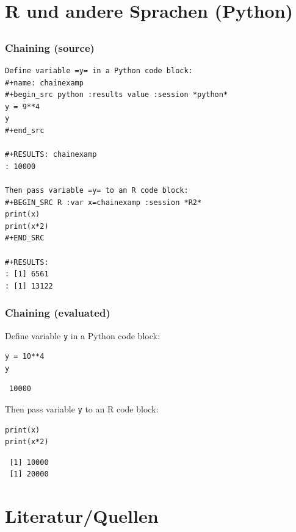 \documentclass[bigger]{beamer}
\begin{document}
\section{R und andere Sprachen (Python)}
\label{sec-4}
\subsection{}
\begin{frame}[fragile,shrink = 10]
\frametitle{Chaining (source)}
\label{sec-4-1-1}




\lstset{language=org}
\begin{lstlisting}
Define variable =y= in a Python code block: 
#+name: chainexamp
#+begin_src python :results value :session *python*
y = 9**4
y
#+end_src

#+RESULTS: chainexamp
: 10000

Then pass variable =y= to an R code block:
#+BEGIN_SRC R :var x=chainexamp :session *R2*
print(x)
print(x*2)
#+END_SRC

#+RESULTS:
: [1] 6561
: [1] 13122
\end{lstlisting}
\end{frame}
\begin{frame}[fragile]
\frametitle{Chaining (evaluated)}
\label{sec-4-1-2}


Define variable \texttt{y} in a Python code block: 

\lstset{language=Python}
\begin{lstlisting}
y = 10**4
y
\end{lstlisting}

\begin{verbatim}
 10000
\end{verbatim}


Then pass variable \texttt{y} to an R code block:

\lstset{language=R}
\begin{lstlisting}
print(x)
print(x*2)
\end{lstlisting}

\begin{verbatim}
 [1] 10000
 [1] 20000
\end{verbatim}
\end{frame}
\section{Literatur/Quellen}
\label{sec-5}
\end{document}

